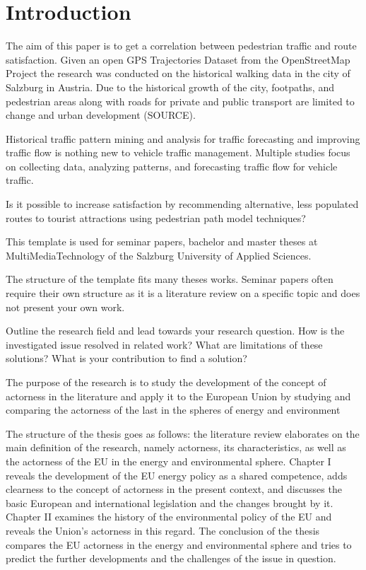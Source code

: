 

\section{Introduction}
\label{section:Introduction}

The aim of this paper is to get a correlation between pedestrian traffic and route satisfaction. Given an open GPS Trajectories Dataset from the OpenStreetMap Project the research was conducted on the historical walking data in the city of Salzburg in Austria. Due to the historical growth of the city, footpaths, and pedestrian areas along with roads for private and public transport are limited to change and urban development (SOURCE). 

Historical traffic pattern mining and analysis for traffic forecasting and improving traffic flow is nothing new to vehicle traffic management. Multiple studies focus on collecting data, analyzing patterns, and forecasting traffic flow for vehicle traffic. 

Is it possible to increase satisfaction by recommending alternative, less populated routes to tourist attractions using pedestrian path model techniques?

This template is used for seminar papers, bachelor and master theses at MultiMediaTechnology of the Salzburg University of Applied Sciences. 

The structure of the template fits many theses works. Seminar papers often require their own structure as it is a literature review on a specific topic and does not present your own work.

Outline the research field and lead towards your research question. How is the investigated issue resolved in related work? What are limitations of these solutions? What is your contribution to find a solution?

The purpose of the research is to study the development of the concept of actorness in the literature and apply it to the European Union by studying and comparing the actorness of the last in the spheres of energy and environment

The structure of the thesis goes as follows: the literature review elaborates on the main definition of the research, namely actorness, its characteristics, as well as the actorness of the EU in the energy and environmental sphere. Chapter I reveals the development of the EU energy policy as a shared competence, adds clearness to the concept of actorness in the present context, and discusses the basic European and international legislation and the changes brought by it. Chapter II examines the history of the environmental policy of the EU and reveals the Union’s actorness in this regard. The conclusion of the thesis compares the EU actorness in the energy and environmental sphere and tries to predict the further developments and the challenges of the issue in question.

